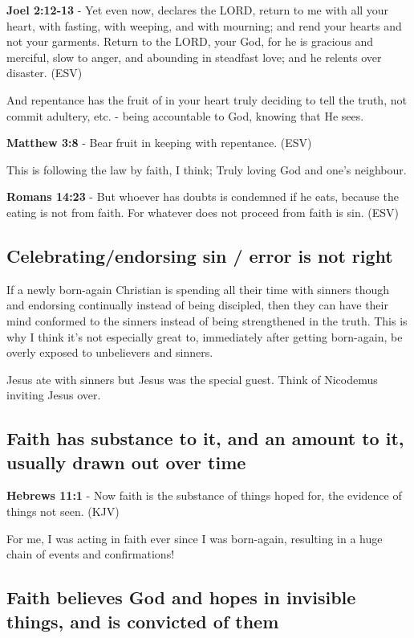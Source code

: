 \documentclass[11pt]{article}
\begin{document}
\textbf{Joel 2:12-13} - Yet even now, declares the LORD, return to me with all your heart, with fasting, with weeping, and with mourning; and rend your hearts and not your garments. Return to the LORD, your God, for he is gracious and merciful, slow to anger, and abounding in steadfast love; and he relents over disaster. (ESV)

And repentance has the fruit of in your heart truly deciding to tell the truth, not commit adultery, etc. - being accountable to God, knowing that He sees.

\textbf{Matthew 3:8} - Bear fruit in keeping with repentance. (ESV)

This is following the law by faith, I think; Truly loving God and one's neighbour.

\textbf{Romans 14:23} - But whoever has doubts is condemned if he eats, because the eating is not from faith. For whatever does not proceed from faith is sin. (ESV)

\subsection{Celebrating/endorsing sin / error is not right}
\label{sec:orgd10ebea}

If a newly born-again Christian is spending all their time with sinners though and endorsing continually instead of being discipled, then they can
have their mind conformed to the sinners instead of being strengthened in the truth. This is why I think it's not especially great to, immediately after getting born-again,
be overly exposed to unbelievers and sinners.

Jesus ate with sinners but Jesus was the special guest. Think of Nicodemus inviting Jesus over.

\subsection{Faith has substance to it, and an amount to it, usually drawn out over time}
\label{sec:org309fcb8}
\textbf{Hebrews 11:1} - Now faith is the substance of things hoped for, the evidence of things not seen. (KJV)

For me, I was acting in faith ever since I was born-again, resulting in a huge chain of events and confirmations!

\subsection{Faith believes God and hopes in invisible things, and is convicted of them}
\label{sec:orga38e846}
\end{document}
